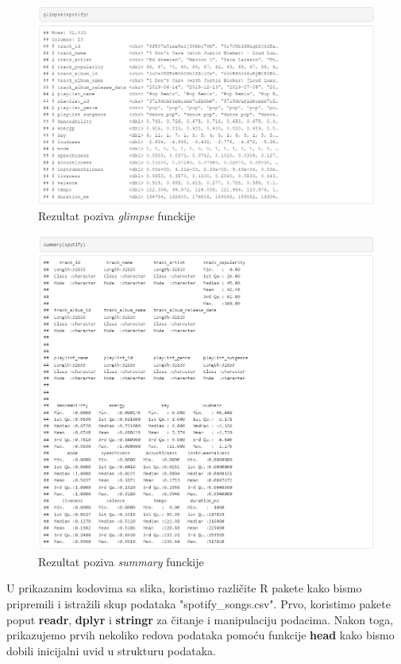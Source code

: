 		\begin{figure}[H]
			\includegraphics[scale=0.7]{slike/glimpse.png}
			\centering
			\caption{Rezultat poziva \textit{glimpse} funckije}
			
		\end{figure}
		
		\begin{figure}[H]
			\includegraphics[scale=0.7]{slike/summary.png}
			\centering
			\caption{Rezultat poziva \textit{summary} funckije}
			
		\end{figure}
		
		U prikazanim kodovima sa slika, koristimo različite R pakete kako bismo pripremili i istražili skup podataka "spotify\_songs.csv". Prvo, koristimo pakete poput \textbf{readr}, \textbf{dplyr} i \textbf{stringr} za čitanje i manipulaciju podacima. Nakon toga, prikazujemo prvih nekoliko redova podataka pomoću funkcije \textbf{head} kako bismo dobili inicijalni uvid u strukturu podataka.
		
